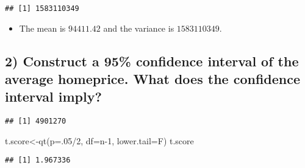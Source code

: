\documentclass[
  12pt,
]{article}
\newenvironment{Shaded}{\begin{snugshade}}{\end{snugshade}}
\newcommand{\AttributeTok}[1]{\textcolor[rgb]{0.77,0.63,0.00}{#1}}
\newcommand{\DecValTok}[1]{\textcolor[rgb]{0.00,0.00,0.81}{#1}}
\newcommand{\FunctionTok}[1]{\textcolor[rgb]{0.00,0.00,0.00}{#1}}
\newcommand{\NormalTok}[1]{#1}
\newcommand{\OtherTok}[1]{\textcolor[rgb]{0.56,0.35,0.01}{#1}}
\newcommand{\SpecialCharTok}[1]{\textcolor[rgb]{0.00,0.00,0.00}{#1}}
\providecommand{\tightlist}{%
  \setlength{\itemsep}{0pt}\setlength{\parskip}{0pt}}
\begin{document}
\begin{verbatim}
## [1] 1583110349
\end{verbatim}

\begin{itemize}
\tightlist
\item
  The mean is \(94411.42\) and the variance is \(1583110349\).\\
\end{itemize}

\hypertarget{construct-a-95-confidence-interval-of-the-average-homeprice.-what-does-the-confidence-interval-imply}{%
\subsection{2) Construct a 95\% confidence interval of the average
homeprice. What does the confidence interval
imply?}\label{construct-a-95-confidence-interval-of-the-average-homeprice.-what-does-the-confidence-interval-imply}}

\begin{Shaded}
\end{Shaded}

\begin{verbatim}
## [1] 4901270
\end{verbatim}

\begin{Shaded}
\begin{Highlighting}[]
\NormalTok{t.score}\OtherTok{\textless{}{-}}\FunctionTok{qt}\NormalTok{(}\AttributeTok{p=}\NormalTok{.}\DecValTok{05}\SpecialCharTok{/}\DecValTok{2}\NormalTok{, }\AttributeTok{df=}\NormalTok{n}\DecValTok{{-}1}\NormalTok{, }\AttributeTok{lower.tail=}\NormalTok{F)}
\NormalTok{t.score}
\end{Highlighting}
\end{Shaded}

\begin{verbatim}
## [1] 1.967336
\end{verbatim}

\begin{Shaded}
\end{Shaded}
\end{document}
